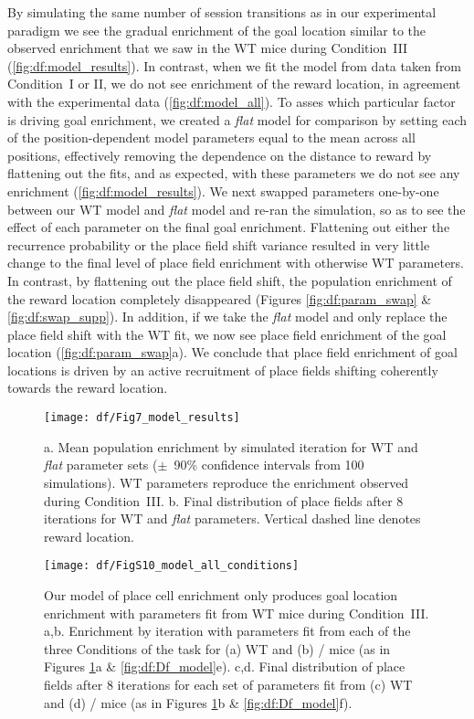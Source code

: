 By simulating the same number of session transitions as in our experimental paradigm we see the gradual enrichment of the goal location similar to the observed enrichment that we saw in the WT mice during Condition~III (\autoref{fig:df:model_results}). In contrast, when we fit the model from data taken from Condition~I or II, we do not see enrichment of the reward location, in agreement with the experimental data (\autoref{fig:df:model_all}). To asses which particular factor is driving goal enrichment, we created a \emph{flat} model for comparison by setting each of the position-dependent model parameters equal to the mean across all positions, effectively removing the dependence on the distance to reward by flattening out the fits, and as expected, with these parameters we do not see any enrichment (\autoref{fig:df:model_results}). We next swapped parameters one-by-one between our WT model and \emph{flat} model and re-ran the simulation, so as to see the effect of each parameter on the final goal enrichment. Flattening out either the recurrence probability or the place field shift variance resulted in very little change to the final level of place field enrichment with otherwise WT parameters. In contrast, by flattening out the place field shift, the population enrichment of the reward location completely disappeared (Figures \ref{fig:df:param_swap} \& \ref{fig:df:swap_supp}). In addition, if we take the \emph{flat} model and only replace the place field shift with the WT fit, we now see place field enrichment of the goal location (\autoref{fig:df:param_swap}a). We conclude that place field enrichment of goal locations is driven by an active recruitment of place fields shifting coherently towards the reward location.

\begin{figure}
	\centering
	\texttt{[image: df/Fig7\_model\_results]}
	\caption[Simulated place field reward enrichment]{a. Mean population enrichment by simulated iteration for WT and \emph{flat} parameter sets ($\pm$~90\% confidence intervals from 100 simulations). WT parameters reproduce the enrichment observed during Condition~III.
	b. Final distribution of place fields after 8 iterations for WT and \emph{flat} parameters. Vertical dashed line denotes reward location.}
	\label{fig:df:model_results}
\end{figure}

\begin{figure}
	\centering
	\texttt{[image: df/FigS10\_model\_all\_conditions]}
	\caption[Modeled enrichment for all three Conditions]{Our model of place cell enrichment only produces goal location enrichment with parameters fit from WT mice during Condition~III.
	a,b. Enrichment by iteration with parameters fit from each of the three Conditions of the task for (a) WT and (b) \df/ mice (as in Figures \ref{fig:df:model_results}a \& \ref{fig:df:Df_model}e).
	c,d. Final distribution of place fields after 8 iterations for each set of parameters fit from (c) WT and (d) \df/ mice (as in Figures \ref{fig:df:model_results}b \& \ref{fig:df:Df_model}f).}
	\label{fig:df:model_all}
\end{figure}

